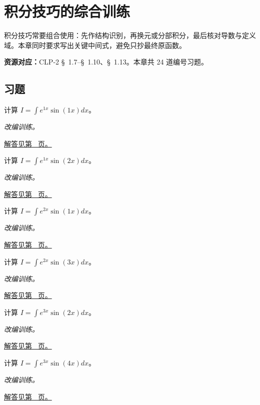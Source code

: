 \documentclass[12pt,fontset=fandol]{ctexart}
\begin{document}
\clearpage
\section{积分技巧的综合训练}\label{sec:ch15}
积分技巧常要组合使用：先作结构识别，再换元或分部积分，最后核对导数与定义域。本章同时要求写出关键中间式，避免只抄最终原函数。

\textbf{资源对应：}CLP-2 \S~1.7--\S~1.10、\S~1.13。本章共 24 道编号习题。
\subsection{习题}
\begin{example}[指数乘正弦的循环分部积分]\label{ex:c15q1}
计算 $I=\int e^{1x}\sin(1x)dx$。
\par\textit{改编训练。}\par\hyperref[ans:c15q1]{解答见第~\pageref{ans:c15q1} 页。}
\end{example}
\begin{example}[指数乘正弦的循环分部积分]\label{ex:c15q2}
计算 $I=\int e^{1x}\sin(2x)dx$。
\par\textit{改编训练。}\par\hyperref[ans:c15q2]{解答见第~\pageref{ans:c15q2} 页。}
\end{example}
\begin{example}[指数乘正弦的循环分部积分]\label{ex:c15q3}
计算 $I=\int e^{2x}\sin(1x)dx$。
\par\textit{改编训练。}\par\hyperref[ans:c15q3]{解答见第~\pageref{ans:c15q3} 页。}
\end{example}
\begin{example}[指数乘正弦的循环分部积分]\label{ex:c15q4}
计算 $I=\int e^{2x}\sin(3x)dx$。
\par\textit{改编训练。}\par\hyperref[ans:c15q4]{解答见第~\pageref{ans:c15q4} 页。}
\end{example}
\begin{example}[指数乘正弦的循环分部积分]\label{ex:c15q5}
计算 $I=\int e^{3x}\sin(2x)dx$。
\par\textit{改编训练。}\par\hyperref[ans:c15q5]{解答见第~\pageref{ans:c15q5} 页。}
\end{example}
\begin{example}[指数乘正弦的循环分部积分]\label{ex:c15q6}
计算 $I=\int e^{3x}\sin(4x)dx$。
\par\textit{改编训练。}\par\hyperref[ans:c15q6]{解答见第~\pageref{ans:c15q6} 页。}
\end{example}
\end{document}
